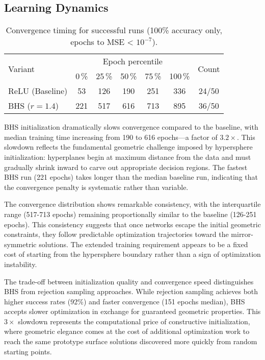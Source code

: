 
\subsection*{Learning Dynamics}

\begin{table}[ht]
\centering
\caption{Convergence timing for successful runs (100\% accuracy only, epochs to MSE < $10^{-7}$).}
\label{tab:relu1-bhs-timing}
\begin{tabular}{lcccccc}
\toprule
\multirow{2}{*}{Variant} &
\multicolumn{5}{c}{Epoch percentile} & \multirow{2}{*}{Count} \\
\cmidrule(lr){2-6}
& 0\,\% & 25\,\% & 50\,\% & 75\,\% & 100\,\% & \\
\midrule
ReLU (Baseline) & 53 & 126 & 190 & 251 & 336 & 24/50 \\
BHS ($r=1.4$) & 221 & 517 & 616 & 713 & 895 & 36/50 \\
\bottomrule
\end{tabular}
\end{table}

BHS initialization dramatically slows convergence compared to the baseline, with median training time increasing from 190 to 616 epochs—a factor of $3.2\times$. This slowdown reflects the fundamental geometric challenge imposed by hypersphere initialization: hyperplanes begin at maximum distance from the data and must gradually shrink inward to carve out appropriate decision regions. The fastest BHS run (221 epochs) takes longer than the median baseline run, indicating that the convergence penalty is systematic rather than variable.

The convergence distribution shows remarkable consistency, with the interquartile range (517-713 epochs) remaining proportionally similar to the baseline (126-251 epochs). This consistency suggests that once networks escape the initial geometric constraints, they follow predictable optimization trajectories toward the mirror-symmetric solutions. The extended training requirement appears to be a fixed cost of starting from the hypersphere boundary rather than a sign of optimization instability.

The trade-off between initialization quality and convergence speed distinguishes BHS from rejection sampling approaches. While rejection sampling achieves both higher success rates (92\%) and faster convergence (151 epochs median), BHS accepts slower optimization in exchange for guaranteed geometric properties. This $3\times$ slowdown represents the computational price of constructive initialization, where geometric elegance comes at the cost of additional optimization work to reach the same prototype surface solutions discovered more quickly from random starting points.

